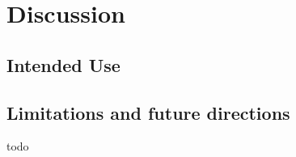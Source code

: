 

\section{Discussion} \label{sec:discussion}

\subsection{Intended Use}
%
%
%
%
%
%
%

\subsection{Limitations and future directions}

todo

